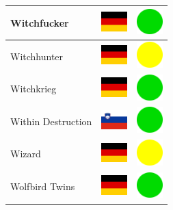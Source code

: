 \documentclass[12pt, a4paper, twoside]{report}
\begin{document}
\begin{center}
\begin{longtable}{|p{5cm}|p{2cm}|p{2cm}|}
 Witchfucker                                                & \includegraphics[width=1cm]{../img/flags/de} &   \includegraphics[width=1cm]{../likes/y} \\ \hline
 Witchhunter                                                & \includegraphics[width=1cm]{../img/flags/de} &   \includegraphics[width=1cm]{../likes/m} \\ \hline
 Witchkrieg                                                 & \includegraphics[width=1cm]{../img/flags/de} &   \includegraphics[width=1cm]{../likes/y} \\ \hline
 Within Destruction                                         & \includegraphics[width=1cm]{../img/flags/si} &   \includegraphics[width=1cm]{../likes/y} \\ \hline
 Wizard                                                     & \includegraphics[width=1cm]{../img/flags/de} &   \includegraphics[width=1cm]{../likes/m} \\ \hline
 Wolfbird Twins                                             & \includegraphics[width=1cm]{../img/flags/de} &   \includegraphics[width=1cm]{../likes/y} \\ \hline

\end{longtable}
\end{center}
\end{document}
